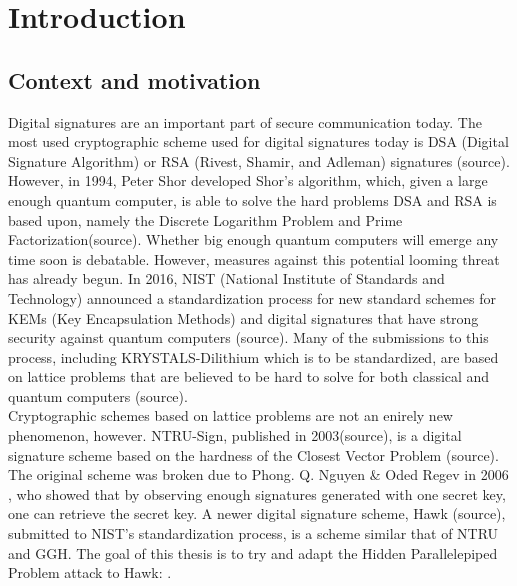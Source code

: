 \chapter{Introduction}
\section{Context and motivation}
Digital signatures are an important part of secure communication today. The most used cryptographic scheme used for digital signatures today is DSA (Digital Signature Algorithm) or RSA (Rivest, Shamir, and Adleman) signatures (source).
However, in 1994, Peter Shor developed Shor's algorithm, which, given a large enough quantum computer, is able to solve the hard problems DSA and RSA is based upon, namely the Discrete Logarithm Problem and Prime Factorization(source). 
Whether big enough quantum computers will emerge any time soon is debatable. However, measures against this potential looming threat has already begun. In 2016, NIST (National Institute of Standards and Technology)
announced a standardization process for new standard schemes for KEMs (Key Encapsulation Methods) and digital signatures that have strong security against quantum computers (source). Many of the submissions to this process,
including KRYSTALS-Dilithium which is to be standardized, are based on lattice problems that are believed to be hard to solve for both classical and quantum computers (source). \hfill \break \\

Cryptographic schemes based on lattice problems are not an enirely new phenomenon, however. NTRU-Sign, published in 2003(source), is a digital signature scheme based on the hardness of the Closest Vector Problem (source).
The original scheme was broken due to Phong. Q. Nguyen \& Oded Regev in 2006 \cite{NR09}, who showed that by observing enough signatures generated with one secret key, one can retrieve the secret key.
A newer digital signature scheme, Hawk (source), submitted to NIST's standardization process, is a scheme similar that of NTRU and GGH. 
The goal of this thesis is to try and adapt the Hidden Parallelepiped Problem attack to Hawk: \cite{HawkSpec24}.

